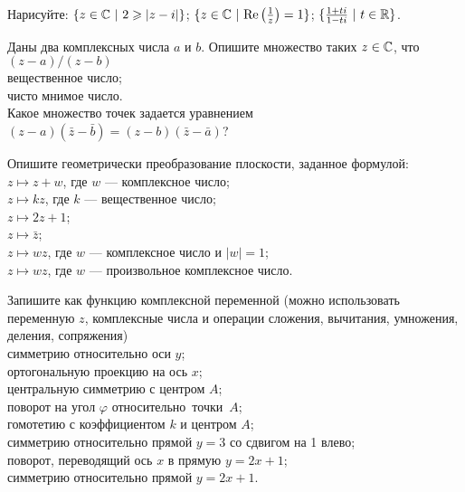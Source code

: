\documentclass[a4paper, 12pt]{article}
\begin{document}

\medskip



Нарисуйте: %
 $\{z\in\mathbb{C}\,\,|\,\,2\geqslant|z-i|\}$;
 $\{z\in\mathbb{C}\,\,|\,\,{\rm Re}\left(\frac{1}{z}\right)=1\}$;
 $\{\frac{1+ti}{1-ti}\,\,|\,\,t\in\mathbb{R}\}$.

Даны два комплексных числа $a$ и $b$. Опишите множество таких $z\in\mathbb{C}$,
что $(z-a)/(z-b)$\\
вещественное число;\\
чисто мнимое число.\\
 Какое множество точек задается уравнением $(z-a)(\bar z - \bar b)=(z-b)(\bar z - \bar a)$?

Опишите геометрически преобразование плоскости, заданное формулой:\\
 $z\longmapsto z+w$, где $w$ --- комплексное число;\\
 $z\longmapsto kz$, где $k$ --- вещественное число;\\
 $z\longmapsto 2z+1$;\\
 $z\longmapsto \bar z$;\\
 $z\longmapsto wz$, где $w$ --- комплексное число и $|w|=1$;\\
 $z\longmapsto wz$, где $w$ --- произвольное комплексное число.


Запишите %
как функцию комплексной переменной (можно использовать переменную $z$, комплексные числа и операции сложения, вычитания, умножения, деления, сопряжения)\\
 симме\-трию относительно оси $y$;\\
 ортогона\-ль\-ную проекцию на ось $x$;\\
 центральную симметрию с центром $A$;\\
 поворот на угол $\varphi$ относительно~точки~$A$;\\
 гомотетию с коэффициентом $k$ и центром $A$;\\
симметрию относительно прямой $y=3$ со сдвигом на 1 влево;\\
 поворот, %
переводящий ось $x$ в прямую $y=2x+1$;\\
 симметрию относительно прямой $y=2x+1$.\\
\end{document}
